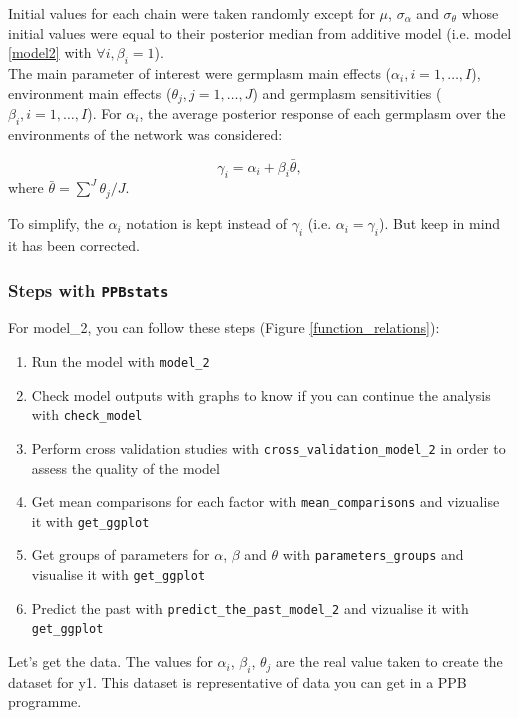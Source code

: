 \documentclass{article}\usepackage[]{graphicx}\usepackage[]{color}
\newcommand{\pack}{\texttt{PPBstats}}
\begin{document}
Initial values for each chain were taken randomly except for $\mu$, $\sigma_{\alpha}$ and $\sigma_{\theta}$ whose initial values were equal to their posterior median from additive model (i.e. model \ref{model2} with $\forall i, \beta_{i}=1$). \\


The main parameter of interest were 
germplasm main effects ($\alpha_{i}, i = 1,\ldots, I$), 
environment main effects ($\theta_{j}, j = 1,\ldots, J$) and 
germplasm sensitivities ($\beta_{i}, i = 1,\ldots, I$).
For $\alpha_i$, the average posterior response of each germplasm over the environments of the network was considered:

\begin{displaymath}
\gamma_i = \alpha_i + \beta_{i} \bar{\theta},
\end{displaymath}
where
$\bar{\theta} = \sum_{}^{J} \theta_j/J$.

To simplify, the $\alpha_i$ notation is kept instead of $\gamma_i$ (i.e. $\alpha_i = \gamma_i$).
But keep in mind it has been corrected.

\subsubsection{Steps with \pack}

For model\_2, you can follow these steps (Figure \ref{function_relations}):

\begin{enumerate}
\item Run the model with \texttt{model\_2}
\item Check model outputs with graphs to know if you can continue the analysis with \texttt{check\_model}
\item Perform cross validation studies with \texttt{cross\_validation\_model\_2} in order to assess the quality of the model
\item Get mean comparisons for each factor with \texttt{mean\_comparisons} and vizualise it with \texttt{get\_ggplot}
\item Get groups of parameters for $\alpha$, $\beta$ and $\theta$ with \texttt{parameters\_groups} and visualise it with \texttt{get\_ggplot}
\item Predict the past with \texttt{predict\_the\_past\_model\_2} and vizualise it with \texttt{get\_ggplot}
\end{enumerate}

Let's get the data.
The values for $\alpha_i$, $\beta_i$, $\theta_j$ are the real value taken to create the dataset for y1.
This dataset is representative of data you can get in a PPB programme.
\end{document}

